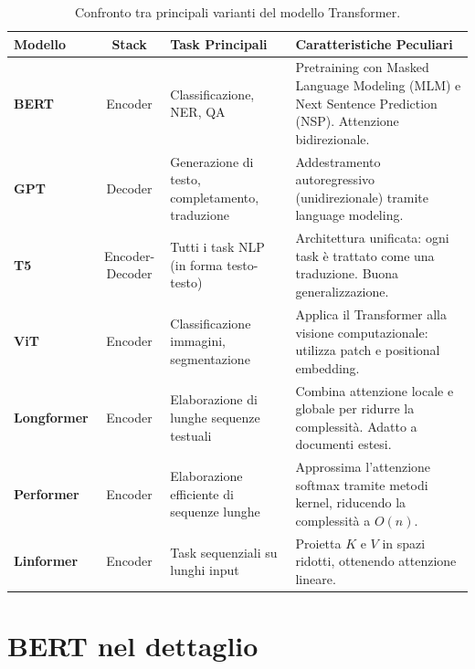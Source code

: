 \begin{table}
    \centering
    \renewcommand{\arraystretch}{1.3}
    \caption{Confronto tra principali varianti del modello Transformer.}
    \label{tab:transformer_variants}
    \begin{tabularx}{\textwidth}{>{\bfseries}l c X X}
        \toprule
        Modello & Stack & Task Principali & Caratteristiche Peculiari \\
        \midrule
        BERT & Encoder & Classificazione, NER, QA &
        Pretraining con Masked Language Modeling (MLM) e Next Sentence Prediction (NSP). Attenzione bidirezionale. \\
        GPT & Decoder & Generazione di testo, completamento, traduzione &
        Addestramento autoregressivo (unidirezionale) tramite language modeling. \\
        T5 & Encoder-Decoder & Tutti i task NLP (in forma testo-testo) &
        Architettura unificata: ogni task è trattato come una traduzione. Buona generalizzazione. \\
        ViT & Encoder & Classificazione immagini, segmentazione &
        Applica il Transformer alla visione computazionale: utilizza patch e positional embedding. \\
        Longformer & Encoder & Elaborazione di lunghe sequenze testuali &
        Combina attenzione locale e globale per ridurre la complessità. Adatto a documenti estesi. \\
        Performer & Encoder & Elaborazione efficiente di sequenze lunghe &
        Approssima l’attenzione softmax tramite metodi kernel, riducendo la complessità a $O(n)$. \\
        Linformer & Encoder & Task sequenziali su lunghi input &
        Proietta $K$ e $V$ in spazi ridotti, ottenendo attenzione lineare. \\
        \bottomrule
    \end{tabularx}
\end{table}

\section{BERT nel dettaglio}

